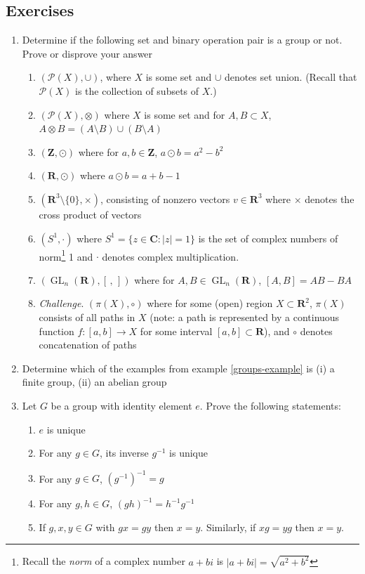 \documentclass[12pt]{article}
\numberwithin{equation}{subsection}
\theoremstyle{note}
\newcommand{\GL}{\operatorname{GL}}
\begin{document}
\subsection{Exercises}
\begin{enumerate}[label=\arabic*.]
	\item Determine if the following set and binary operation pair is a group or not. Prove or disprove your answer
	\begin{enumerate}
		\item $(\mathcal{P}(X), \cup)$, where $X$ is some set and $\cup$ denotes set union. (Recall that $\mathcal{P}(X)$ is the collection of subsets of $X$.)
		\item $(\mathcal{P}(X),\otimes)$ where $X$ is some set and for $A,B\subset X$, $A\otimes B=(A\setminus B)\cup (B\setminus A)$
		\item $(\mathbf{Z}, \odot)$ where for $a,b\in \mathbf{Z}$, $a\odot b=a^2-b^2$
		\item $(\mathbf{R}, \odot)$ where $a\odot b=a+b-1$
		\item $(\mathbf{R}^3\setminus \{0\}, \times)$, consisting of nonzero vectors $v\in \mathbf{R}^3$ where $\times$ denotes the cross product of vectors
		\item $( S^1, \cdot)$ where $S^1=\{ z\in\mathbf{C} : |z|=1\}$ is the set of complex numbers of norm\footnote{Recall the \textit{norm} of a complex number $a+bi$ is $|a+bi|=\sqrt{a^2+b^2}$} 1 and $\cdot$ denotes complex multiplication.
		\item $(\GL_n(\mathbf{R}), [\, , \,])$ where for $A,B\in \GL_n(\mathbf{R})$, $[A,B]=AB-BA$
		\item \textit{Challenge}. $(\pi(X), \circ)$ where for some (open) region $X\subset \mathbf{R}^2$, $\pi(X)$ consists of all paths in $X$ (note: a path is represented by a continuous function $f\colon [a,b]\to X$ for some interval $[a,b]\subset \mathbf{R}$), and $\circ$ denotes concatenation of paths
	\end{enumerate}
	
	\item Determine which of the examples from example \ref{groups-example} is (i) a finite group, (ii) an abelian group

	\item Let $G$ be a group with identity element $e$. Prove the following statements:
		\begin{enumerate}
			\item $e$ is unique
			\item For any $g\in G$, its inverse $g^{-1}$ is unique
			\item For any $g\in G$, $(g^{-1})^{-1}=g$
			\item For any $g,h\in G$, $(gh)^{-1}=h^{-1}g^{-1}$
			\item If $g,x,y\in G$ with $gx=gy$ then $x=y$. Similarly, if $xg=yg$ then $x=y$. 
		\end{enumerate}


\end{enumerate}
\end{document}
